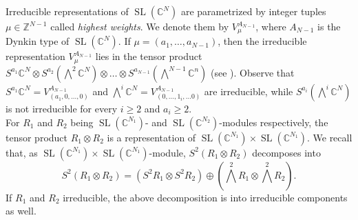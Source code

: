\documentclass[11pt,reqno]{amsart}
\theoremstyle{definition}
\numberwithin{theorem}{section}
\DeclareMathOperator{\SL}{SL}
\numberwithin{equation}{section}
\begin{document}
\indent Irreducible representations of $\SL(\mathbb C^N)$ are parametrized by integer tuples $\mu \in \mathbb Z^{N-1}$ called {\em highest weights}. We denote them by $V_{\mu}^{A_{N-1}}$, where $A_{N-1}$ is the Dynkin type of $\SL(\mathbb C^N)$. If $\mu = (a_1,\ldots , a_{N-1})$, then the irreducible representation $V_{\mu}^{A_{N-1}}$ lies in the tensor product $S^{a_1}\mathbb C^N \otimes S^{a_2}(\bigwedge^2\mathbb C^N) \otimes \ldots \otimes S^{a_{N-1}}(\bigwedge^{N-1}\mathbb C^n)$ (see \cite[Section 15.3]{fulton2013representation}). Observe that $S^{a_1}\mathbb C^N=V_{(a_1,0,\ldots, 0)}^{A_{N-1}}$ and $\bigwedge^i\mathbb C^{N}=V_{(0,\ldots,1_i,\ldots 0)}^{A_{N-1}}$ are irreducible, while $S^{a_i}(\bigwedge^i\mathbb C^N)$ is not irreducible for every $i\geq 2$ and $a_i \geq 2$.\\
For $R_1$ and $R_2$ being $\SL(\mathbb C^{N_1})$- and $\SL(\mathbb C^{N_2})$-modules respectively, the tensor product $R_1\otimes R_2$ is a representation of $\SL(\mathbb C^{N_1})\times \SL(\mathbb C^{N_1})$. We recall that, as $\SL(\mathbb C^{N_1})\times \SL(\mathbb C^{N_1})$-module, $S^2(R_1\otimes R_2)$ decomposes into \cite[Section 6.5.2]{landsberg2011tensors}
\begin{equation}\label{eq:S2(A*B)}
S^2(R_1\otimes R_2) = (S^2R_1 \otimes S^2R_2) \oplus ({\textstyle \bigwedge^2R_1 \otimes \bigwedge^2R_2}) .
\end{equation}
If $R_1$ and $R_2$ irreducible, the above decomposition is into irreducible components as well.

\medskip
\end{document}
